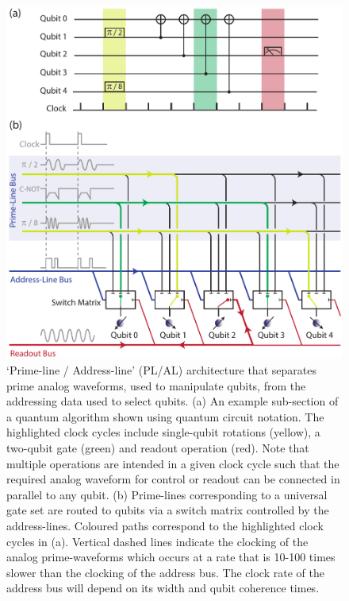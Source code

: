 \begin{figure}
\centering
\includegraphics[width=0.8\linewidth]{Fig0_arch}
\caption[Proposed Prime-line/Address-line architecture]{\label{fig:PLAL}`Prime-line / Address-line' (PL/AL) architecture that separates prime analog waveforms, used to manipulate qubits, from the addressing data used to select qubits. (a) An example sub-section of a quantum algorithm shown using quantum circuit notation. The highlighted clock cycles include single-qubit rotations (yellow), a two-qubit gate (green) and readout operation (red). Note that multiple operations are intended in a given clock cycle such that the required analog waveform for control or readout can be connected in parallel to any qubit. (b) Prime-lines corresponding to a universal gate set are routed to qubits via a switch matrix controlled by the address-lines. Coloured paths correspond to the highlighted clock cycles in (a). Vertical dashed lines indicate the clocking of the analog prime-waveforms which occurs at a rate that is 10-100 times slower than the clocking of the address bus. The clock rate of the address bus will depend on its width and qubit coherence times.}
\end{figure}

